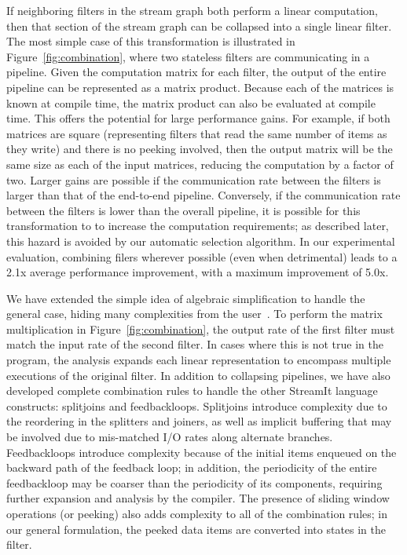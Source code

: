 If neighboring filters in the stream graph both perform a linear
computation, then that section of the stream graph can be collapsed
into a single linear filter.  The most simple case of this
transformation is illustrated in Figure~\ref{fig:combination}, where
two stateless filters are communicating in a pipeline.  Given the
computation matrix for each filter, the output of the entire pipeline
can be represented as a matrix product.  Because each of the matrices
is known at compile time, the matrix product can also be evaluated at
compile time.  This offers the potential for large performance gains.
For example, if both matrices are square (representing filters that
read the same number of items as they write) and there is no peeking
involved, then the output matrix will be the same size as each of the
input matrices, reducing the computation by a factor of two.  Larger
gains are possible if the communication rate between the filters is
larger than that of the end-to-end pipeline.  Conversely, if the
communication rate between the filters is lower than the overall
pipeline, it is possible for this transformation to to increase the
computation requirements; as described later, this hazard is avoided
by our automatic selection algorithm.  In our experimental evaluation,
combining filers wherever possible (even when detrimental) leads to a
2.1x average performance improvement, with a maximum improvement of
5.0x.

We have extended the simple idea of algebraic simplification to handle
the general case, hiding many complexities from the
user~\cite{agrawal-cases05}.  To perform the matrix multiplication
in Figure~\ref{fig:combination}, the output rate of the first filter
must match the input rate of the second filter.  In cases where this
is not true in the program, the analysis expands each linear
representation to encompass multiple executions of the original
filter.  In addition to collapsing pipelines, we have also developed
complete combination rules to handle the other StreamIt language
constructs: splitjoins and feedbackloops.  Splitjoins introduce
complexity due to the reordering in the splitters and joiners, as well
as implicit buffering that may be involved due to mis-matched I/O
rates along alternate branches.  Feedbackloops introduce complexity
because of the initial items enqueued on the backward path of the
feedback loop; in addition, the periodicity of the entire feedbackloop
may be coarser than the periodicity of its components, requiring
further expansion and analysis by the compiler.  The presence of
sliding window operations (or peeking) also adds complexity to all of
the combination rules; in our general formulation, the peeked data
items are converted into states in the filter.

